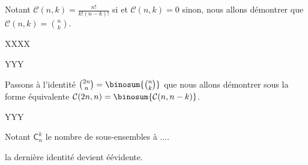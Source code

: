 Notant $\mathcal{C}(n,k) = \frac{n!}{k!(n-k)!}$ si
et $\mathcal{C}(n,k) = 0$ sinon, nous allons démontrer que $\mathcal{C}(n,k) = \binom{n}{k}$.

XXXX


%
            {\factobinomintertree}{}


YYY





Passons à l'identité $\binom{2n}{n} = \binosum{\binom{n}{k}}$ que nous allons démontrer sous la forme équivalente  $\mathcal{C}(2n,n) = \binosum{\mathcal{C}(n,n-k)}$.

YYY



\begin{remark}
	Notant $\mathsf{C}_n^k$ le nombre de sous-ensembles à ....
	
	la dernière identité devient éévidente.
\end{remark}

